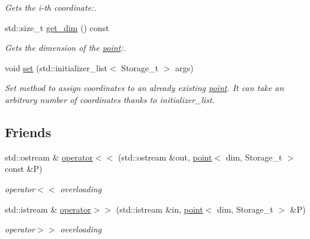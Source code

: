 \begin{DoxyCompactItemize}
\begin{DoxyCompactList}\small\item\em Gets the i-\/th coordinate:. \item\end{DoxyCompactList}\item 
\hypertarget{classpoint_a14969f2ce0d2b251efdce294e2f3c982}{
std::size\_\-t \hyperlink{classpoint_a14969f2ce0d2b251efdce294e2f3c982}{get\_\-dim} () const }
\label{classpoint_a14969f2ce0d2b251efdce294e2f3c982}

\begin{DoxyCompactList}\small\item\em Gets the dimension of the \hyperlink{classpoint}{point}:. \item\end{DoxyCompactList}\item 
void \hyperlink{classpoint_adf5774c5279be365241693d6da0aaf8c}{set} (std::initializer\_\-list$<$ Storage\_\-t $>$ args)
\begin{DoxyCompactList}\small\item\em Set method to assign coordinates to an already existing \hyperlink{classpoint}{point}. It can take an arbitrary number of coordinates thanks to initializer\_\-list. \item\end{DoxyCompactList}\end{DoxyCompactItemize}
\subsection*{Friends}
\begin{DoxyCompactItemize}
\item 
\hypertarget{classpoint_ad6901581113dba74a3f4dd1b97674abc}{
std::ostream \& \hyperlink{classpoint_ad6901581113dba74a3f4dd1b97674abc}{operator$<$$<$} (std::ostream \&out, \hyperlink{classpoint}{point}$<$ dim, Storage\_\-t $>$ const \&P)}
\label{classpoint_ad6901581113dba74a3f4dd1b97674abc}

\begin{DoxyCompactList}\small\item\em operator$<$$<$ overloading \item\end{DoxyCompactList}\item 
\hypertarget{classpoint_a857310f166ea07855140beb33d8d024f}{
std::istream \& \hyperlink{classpoint_a857310f166ea07855140beb33d8d024f}{operator$>$$>$} (std::istream \&in, \hyperlink{classpoint}{point}$<$ dim, Storage\_\-t $>$ \&P)}
\label{classpoint_a857310f166ea07855140beb33d8d024f}

\begin{DoxyCompactList}\small\item\em operator$>$$>$ overloading \item\end{DoxyCompactList}\end{DoxyCompactItemize}



